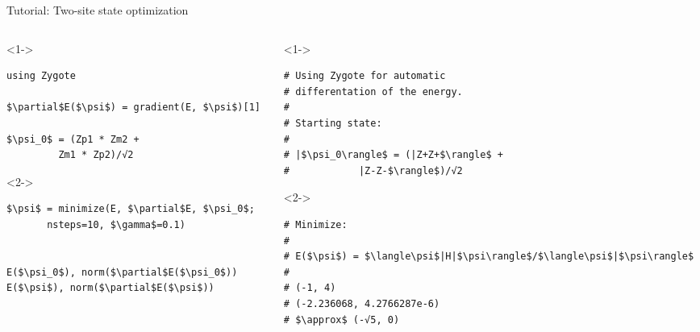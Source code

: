 \begin{frame}[fragile]{Tutorial: Two-site state optimization}


\begin{columns}

\begin{column}{5cm}

\begin{onlyenv}<1->

\begin{lstlisting}[language=JuliaLocal, style=julia, mathescape, basicstyle=\small]
using Zygote

$\partial$E($\psi$) = gradient(E, $\psi$)[1]

$\psi_0$ = (Zp1 * Zm2 +
         Zm1 * Zp2)/√2
 \end{lstlisting}

\end{onlyenv}

\begin{onlyenv}<2->

\begin{lstlisting}[language=JuliaLocal, style=julia, mathescape, basicstyle=\small]
$\psi$ = minimize(E, $\partial$E, $\psi_0$;
       nsteps=10, $\gamma$=0.1)


E($\psi_0$), norm($\partial$E($\psi_0$))
E($\psi$), norm($\partial$E($\psi$))
 \end{lstlisting}

\end{onlyenv}

\end{column}

\begin{column}{5cm}

\begin{onlyenv}<1->

\begin{lstlisting}[style=julia, numbers=none, mathescape, basicstyle=\small]
# Using Zygote for automatic
# differentation of the energy.
#
# Starting state:
#
# |$\psi_0\rangle$ = (|Z+Z+$\rangle$ +
#            |Z-Z-$\rangle$)/√2
\end{lstlisting}

\end{onlyenv}

\begin{onlyenv}<2->

\begin{lstlisting}[style=julia, numbers=none, mathescape, basicstyle=\small]
# Minimize:
#
# E($\psi$) = $\langle\psi$|H|$\psi\rangle$/$\langle\psi$|$\psi\rangle$
#
# (-1, 4)
# (-2.236068, 4.2766287e-6)
# $\approx$ (-√5, 0)
\end{lstlisting}

\end{onlyenv}

\end{column}

\end{columns}

\end{frame}
